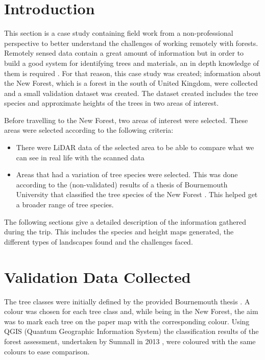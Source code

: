 \documentclass{subfiles}
\begin{document}
	\section{Introduction}
	\par This section is a case study containing field work from a non-professional perspective to better understand the challenges of working remotely with forests. Remotely sensed data contain a great amount of information but in order to build a good system for identifying trees and materials, an in depth knowledge of them is required \cite{Smith2012}. For that reason, this case study was created; information about the New Forest, which is a forest in the south of United Kingdom, were collected and a small validation dataset was created. The dataset created includes the tree species and approximate heights of the trees in two areas of interest. 
	

	\par Before travelling to the New Forest, two areas of interest were selected. These areas were selected according to the following criteria:
	\begin{itemize}
		\item There were LiDAR data of the selected area to be able to compare what we can see in real life with the scanned data
		\item Areas that had a variation of tree species were selected. This was done according to the (non-validated) results of a thesis of Bournemouth University that classified the tree species of the New Forest \cite{Sumnall2013}. This helped get a broader range of tree species. 
	\end{itemize}
	
	\par The following sections give a detailed description of the information gathered during the trip. This includes the species and height maps generated, the different types of landscapes found and the challenges faced. 
		
	
	   \section{Validation Data Collected}
	   \par The tree classes were initially defined by the provided Bournemouth thesis \cite{Sumnall2013}. A colour was chosen for each tree class and, while being in the New Forest, the aim was to mark each tree on the paper map with the corresponding colour. Using QGIS (Quantum Geographic Information System) the classification results of the forest assessment, undertaken by Sumnall in 2013 \cite{Sumnall2013}, were coloured with the same colours to ease comparison.
	   
\end{document}
